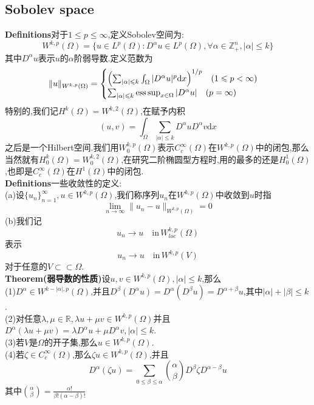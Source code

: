 \documentclass[a4paper,UTF8,12pt]{ctexart}
\begin{document}
\subsection{Sobolev space}
\textbf{Definitions}\quad 对于$1\leqslant p\leqslant\infty$,定义Sobolev空间为:
$$
W^{k,p}(\Omega)=\{u\in L^p(\Omega):D^{\alpha}u\in L^p(\Omega),\forall\alpha\in \mathbb{Z}^n_{+},|\alpha|\leqslant k\}
$$
其中$D^{\alpha}u$表示$u$的$\alpha$阶弱导数.定义范数为
$$\|u\|_{W^{k,p}(\Omega)}=
\begin{cases}
    \Bigl(\sum_{|\alpha|\leqslant k}\int_{\Omega}|D^{\alpha}u|^p\mathrm{d}x\Bigr)^{1/p}\quad (1\leqslant p<\infty)\\
    \sum_{|\alpha|\leqslant k}\text{ess}\sup_{x\in \Omega}|D^{\alpha}u|\quad (p=\infty)\\
\end{cases}
$$
特别的,我们记$H^k(\Omega)=W^{k,2}(\Omega)$,在赋予内积
$$
(u,v)=\int_{\Omega}\sum_{|\alpha|\leqslant k}D^{\alpha}uD^{\alpha}v\mathrm{d}x
$$
之后是一个Hilbert空间.我们用$W^{k,p}_0(\Omega)$表示$C^\infty_c(\Omega)$在$W^{k,p}(\Omega)$中的闭包,那么当然就有$H^k_0(\Omega)=W^{k,2}_0(\Omega)$,在研究二阶椭圆型方程时,用的最多的还是$H^1_0(\Omega)$,也即是$C^\infty_c(\Omega)$在$H^1(\Omega)$中的闭包.\\
\textbf{Definitions}一些收敛性的定义:\\
(a)设$\{u_n\}^\infty_{n=1},u\in W^{k,p}(\Omega)$,我们称序列$u_n$在$W^{k,p}(\Omega)$中收敛到$u$时指
$$
\lim_{n\to\infty}\|u_n-u\|_{W^{k,p}(\Omega)}=0
$$
(b)我们记
$$
u_n\to u\quad \text{in}\,W^{k,p}_{loc}(\Omega)
$$
表示
$$
u_n\to u\quad \text{in}\,W^{k,p}(V)
$$
对于任意的$V\subset \subset \Omega$.\\
\textbf{Theorem(弱导数的性质)}\quad 设$u,v\in W^{k,p}(\Omega),|\alpha|\leqslant k$,那么\\
(1)$D^{\alpha}\in W^{k-|\alpha|,p}(\Omega)$,并且$D^{\beta}(D^{\alpha}u)=D^{\alpha}(D^{\beta}u)=D^{\alpha+\beta}u$,其中$|\alpha|+|\beta|\leqslant k$.\\
(2)对任意$\lambda,\mu\in\mathbb{R},\lambda u+\mu v\in  W^{k,p}(\Omega)$并且$D^{\alpha}(\lambda u+\mu v)=\lambda D^{\alpha}u+\mu D^{\alpha}v,|\alpha|\leqslant k$.\\
(3)若$V$是$\Omega$的开子集,那么$u\in W^{k,p}(\Omega)$.\\
(4)若$\zeta \in C^{\infty}_c(\Omega)$,那么$\zeta u\in W^{k,p}(\Omega)$,并且
$$
D^{\alpha}(\zeta u)=\sum_{0\leqslant \beta\leqslant \alpha}\binom{\alpha}{\beta}D^{\beta}\zeta D^{\alpha-\beta}u 
$$
其中$\binom{\alpha}{\beta} = \frac{\alpha !}{\beta !(\alpha-\beta)!}$\\
\end{document}
